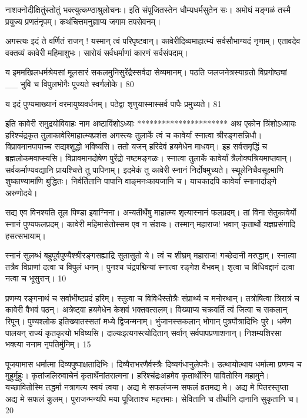 नाशक्नोदीक्षितुंस्तोतुं भक्त्युत्कण्ठाश्रुलोचनः।
इति संपूजितस्तेन धौम्यधर्मसुतेन सः।
अमोघं मङ्गळं तस्मै प्रयुज्य प्रणतंनृपम्।
कथंचित्तमनुज्ञाप्य जगाम तपसेवनम्।

अगस्त्यः
इदं ते वर्णितं राजन् ! यस्मान् त्वं परिपृष्टवान्।
कावेरीदिव्यमाहात्म्यं सर्वसौभाग्यदं नृणाम्।
एतावदेव वक्तव्यं कावेरी महिमाशुभः।
सारोयं सर्वधर्माणां कारणं सर्वसंपदाम्।

य इममखिलधर्मश्रेयसां मूलसारं
सकलमुनिसुरेंद्रैस्सर्वदा सेव्यमानम्।
पठति जलजनेत्रस्याग्रतो विप्रगोष्ठ्यां __ भुवि च विपुलभोगैः पूज्यते स्वर्गलोके।
80

य इदं पुण्यमाख्यानं वरमायुष्यवर्धनम्।
पठेद्वा शृणुयास्मास्सर्व पापैः प्रमुच्यते।
81

इति कावेरी समुद्रयोविवाहः नाम अष्टाविंशोऽध्याः
**********************
अथ एकोन त्रिंशोऽध्यायः हरिश्चंद्रकृत तुलाकावेरिमाहात्म्यप्रशंस
अगस्त्यः
तुलार्के त्वं च कावेर्यां स्नात्वा श्रीरङ्गसन्निधौ।
विप्रावमानपापाच्च सद्यश्शुद्धो भविष्यसि।
ततो यजन् हरिदेवं हयमेधेन माधवम्।
इह सर्वसमृद्धिं च ब्रह्मलोकमवाप्स्यसि।
विप्रावमानदोषेण पुरेंद्रो नष्टमङ्गळः।
स्नात्वा तुलार्के कावेर्यां त्रैलोक्यश्रियमाप्तवान्।
सर्वकर्माण्यवद्यानि प्रायश्चित्ते तु पापिनाम्।
इदमेकं तु कावेरी स्नानं निर्दोषमुच्यते।
स्थूलेनिचैवसूक्ष्माणि शुष्काण्यामा॑णि बुद्धितः।
निर्वर्तितानि पापानि वाङ्मनःकायजानि च।
याचकादपि कावेर्यां स्नानार्दाङ्गे अरुणोदये।

सद्य एव विनश्यति तूल पिण्डा इवाग्निना।
अन्यतीर्थेषु माहात्म्य शृत्यास्नानं फलप्रदम्।
तां विना सेतुकावेर्यो स्नानं पुण्यफलप्रदम्।
कावेरी महिमासेतोस्सम एव न संशयः।
तस्मान् महाराज! भवान् कृतार्थो यज्ञप्रसंगादि
हसत्सभायाम्।

स्नानं सुलब्धं बहुपूर्वपुण्यैश्श्रीरङ्गसह्याद्रि सुतासुतो ये।
त्वं च शीघ्रम् महाराज! गच्छेदानी मरुद्धाम्।
स्नात्वा तत्रैव विप्राणां दत्वा च विपुलं धनम्।
पुनश्च चंद्रपद्मिन्यां स्नात्वा रङ्गेश वैभवम्।
शृत्वा च विधिवद्दानं दत्वा नत्वा च भूसुरान्।
10

प्रणम्य रङ्गनाथं च सर्वाभीष्टप्रदं हरिम्।
स्तुत्वा च विविधैस्तोत्रैः संप्रार्थ्य च मनोरथान्।
तत्रोषित्वा त्रिरात्रं च कावेरी वैभवं पठन्।
अत्रेष्ट्वा हयमेधेन केशवं भक्तवत्सलम्।
विख्याप्य चक्रवर्ति त्वं जित्वा च सकलान् रिपून्।
पुण्यश्लोक इतिख्यातस्सतां मध्ये द्विजन्मनाम्।
भुंजानस्सकलान् भोगान् पुत्रपौत्रादिभिः पुरे।
धर्मेण पालयन् राज्यं कृतकृत्यो भविष्यसि।
दाल्यःइत्यगस्त्योदितान् सर्वान् सर्वपापप्रणाशनान्।
निशम्यशिरसा भक्त्या ननाम नृपतिर्मुनिम्।
15


पूजयामास धर्मात्मा दिव्यपुष्पाक्षतादिभिः।
दिव्यैराभरणैर्वस्त्रैः दिव्यगंधानुलेपनैः।
उत्थायोत्थाय धर्मात्मा प्रणम्य च मुहुर्मुहुः।
कृतांजलिरुवाचेनं कृतार्थेनांतरात्मना।
हरिश्चंद्रःअहमेव कृतार्थोस्मि पावितोस्मि महामुने।
यच्छावितोस्मि तद्धर्मा नत्रागत्य स्वयं त्वया।
अद्य मे सफलंजन्म सफलं व्रतमद्य मे।
अद्य मे पितरस्तृप्ता अद्य मे सफलं कुलम्।
पुराजन्मन्यपि मया पूजिताश्च महत्तमाः।
सेवितानि च तीर्थानि दानानि सुकृतानि च।
20

